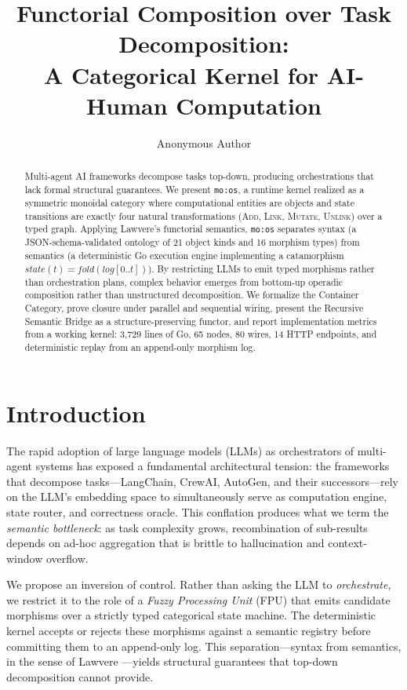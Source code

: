 \documentclass[submission,copyright,creativecommons]{eptcs}
\title{Functorial Composition over Task Decomposition: \\ A Categorical Kernel for AI-Human Computation}
\author{Anonymous Author
\institute{mo:os Project}
\email{author@example.com}
}
\begin{document}
\maketitle

\begin{abstract}
Multi-agent AI frameworks decompose tasks top-down, producing orchestrations
that lack formal structural guarantees. We present \texttt{mo:os}, a runtime
kernel realized as a symmetric monoidal category where computational entities
are objects and state transitions are exactly four natural transformations
(\textsc{Add}, \textsc{Link}, \textsc{Mutate}, \textsc{Unlink}) over a typed
graph. Applying Lawvere's functorial semantics, \texttt{mo:os} separates
syntax (a JSON-schema-validated ontology of 21 object kinds and 16 morphism
types) from semantics (a deterministic Go execution engine implementing a
catamorphism $\mathit{state}(t) = \mathit{fold}(\mathit{log}[0..t])$). By
restricting LLMs to emit typed morphisms rather than orchestration plans,
complex behavior emerges from bottom-up operadic composition rather than
unstructured decomposition. We formalize the Container Category, prove closure
under parallel and sequential wiring, present the Recursive Semantic Bridge as
a structure-preserving functor, and report implementation metrics from a
working kernel: 3{,}729 lines of Go, 65 nodes, 80 wires, 14 HTTP endpoints,
and deterministic replay from an append-only morphism log.
\end{abstract}

\section{Introduction}
\label{sec:intro}

The rapid adoption of large language models (LLMs) as orchestrators of
multi-agent systems has exposed a fundamental architectural tension: the
frameworks that decompose tasks---LangChain, CrewAI, AutoGen, and their
successors---rely on the LLM's embedding space to simultaneously serve as
computation engine, state router, and correctness oracle. This conflation
produces what we term the \emph{semantic bottleneck}: as task complexity grows,
recombination of sub-results depends on ad-hoc aggregation that is brittle to
hallucination and context-window overflow.

We propose an inversion of control. Rather than asking the LLM to
\emph{orchestrate}, we restrict it to the role of a \emph{Fuzzy Processing
Unit} (FPU) that emits candidate morphisms over a strictly typed categorical
state machine. The deterministic kernel accepts or rejects these morphisms
against a semantic registry before committing them to an append-only log. This
separation---syntax from semantics, in the sense of Lawvere
\cite{lawvere1963}---yields structural guarantees that top-down decomposition
cannot provide.
\end{document}
